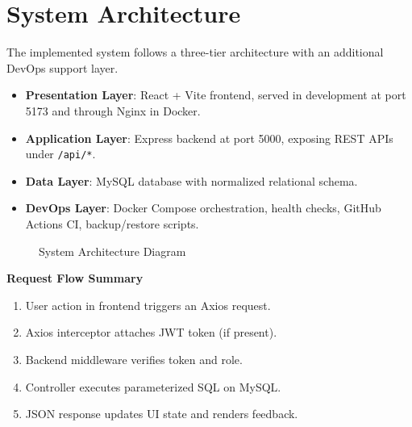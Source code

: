 \chapter{System Architecture}

The implemented system follows a three-tier architecture with an additional DevOps support layer.

\begin{itemize}[leftmargin=1.3cm]
\item \textbf{Presentation Layer}: React + Vite frontend, served in development at port 5173 and through Nginx in Docker.
\item \textbf{Application Layer}: Express backend at port 5000, exposing REST APIs under \texttt{/api/*}.
\item \textbf{Data Layer}: MySQL database with normalized relational schema.
\item \textbf{DevOps Layer}: Docker Compose orchestration, health checks, GitHub Actions CI, backup/restore scripts.
\end{itemize}

\begin{figure}[H]
\centering
\resizebox{0.95\textwidth}{!}{}
\caption{System Architecture Diagram}
\end{figure}

\textbf{Request Flow Summary}
\begin{enumerate}[leftmargin=1.3cm]
\item User action in frontend triggers an Axios request.
\item Axios interceptor attaches JWT token (if present).
\item Backend middleware verifies token and role.
\item Controller executes parameterized SQL on MySQL.
\item JSON response updates UI state and renders feedback.
\end{enumerate}
